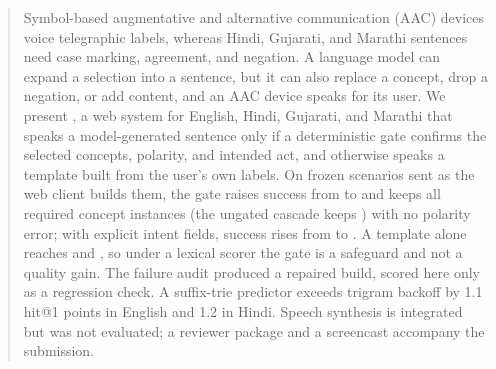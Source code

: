 \begin{abstract}
Symbol-based augmentative and alternative communication (AAC) devices voice telegraphic labels, whereas Hindi, Gujarati, and Marathi sentences need case marking, agreement, and negation.
A language model can expand a selection into a sentence, but it can also replace a concept, drop a negation, or add content, and an AAC device speaks for its user.
We present \sys{}, a web system for English, Hindi, Gujarati, and Marathi that speaks a model-generated sentence only if a deterministic gate confirms the selected concepts, polarity, and intended act, and otherwise speaks a template built from the user's own labels.
On \NPrimAll{} frozen scenarios sent as the web client builds them, the gate raises success from \XPreUSuccPct{} to \XDepUSuccPct{} and keeps all \NConc{} required concept instances (the ungated cascade keeps \XPreUKept{}) with no polarity error; with explicit intent fields, success rises from \XPreSSuccPct{} to \XDepSSuccPct{}.
A template alone reaches \XTmplUSuccPct{} and \XTmplSSuccPct{}, so under a lexical scorer the gate is a safeguard and not a quality gain.
The failure audit produced a repaired build, scored here only as a regression check.
A suffix-trie predictor exceeds trigram backoff by 1.1 hit@1 points in English and 1.2 in Hindi.
Speech synthesis is integrated but was not evaluated; a reviewer package and a screencast accompany the submission.
\end{abstract}
